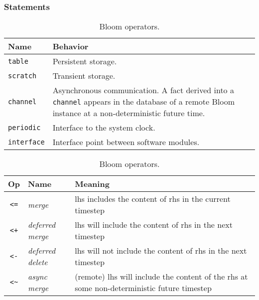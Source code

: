 \subsubsection{Statements}
\begin{table}[t]
\begin{minipage}{.48\textwidth}
\begin{scriptsize}
\begin{tabular}{|l|p{2.32in}|}
\hline
\textbf{Name} & \textbf{Behavior }\\
\hline
\texttt{table} & Persistent storage.\\
\texttt{scratch} & Transient storage.\\
\texttt{channel} & Asynchronous communication. A fact derived into a \texttt{channel} appears in the
database of a remote Bloom instance at a non-deterministic future time.\\
\texttt{periodic} & Interface to the system clock.\\
\texttt{interface} & Interface point between software modules.\\
\hline
\end{tabular}
\caption{Bloom collection types.}
\label{tbl:bloom-collections}
\end{scriptsize}
\end{minipage}
\begin{minipage}{.48\textwidth}
\begin{scriptsize}
\begin{tabular}{|c|l|p{1.85in}|}
\hline
\textbf{Op} & \textbf{Name} & \textbf{Meaning} \\
\hline
\verb|<=| & \emph{merge} & lhs includes the content of rhs in the
current timestep \\
\hline
\verb|<+| & \emph{deferred merge} & lhs will include the content of rhs in the
next timestep \\
\hline
\verb|<-| & \emph{deferred delete} & lhs will not include the content of rhs
in the next timestep \\
\hline
\verb|<~| & \emph{async merge} & (remote) lhs will include the content of the
rhs at some non-deterministic future timestep\\
\hline
\end{tabular}
\caption{Bloom operators.}
\label{tbl:bloom-ops}
\end{scriptsize}
\end{minipage}
\end{table}


